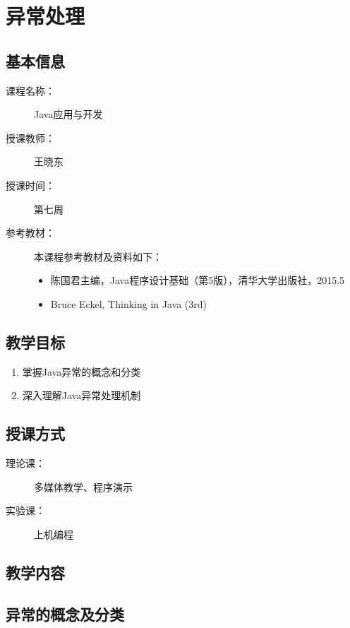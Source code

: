 \chapter{异常处理}
\label{chp:Java-exception-handling}

\section*{基本信息}
\sline
\begin{description}
\item[课程名称：] Java应用与开发
\item[授课教师：] 王晓东
\item[授课时间：] 第七周
\item[参考教材：] 本课程参考教材及资料如下：
  \begin{itemize}
  \item 陈国君主编，Java程序设计基础（第5版），清华大学出版社，2015.5
  \item Bruce Eckel, Thinking in Java (3rd)
  \end{itemize}
\end{description}

\section*{教学目标}

\sline

\begin{enumerate}
\item 掌握Java异常的概念和分类
\item 深入理解Java异常处理机制
\end{enumerate}  

\section*{授课方式}

\sline
\begin{description}
\item[理论课：] 多媒体教学、程序演示
\item[实验课：] 上机编程
\end{description}

\newpage
\section*{教学内容}
\sline

\section{异常的概念及分类}

